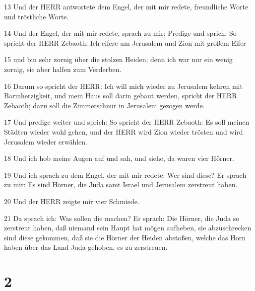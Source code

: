 \par 13 Und der HERR antwortete dem Engel, der mit mir redete, freundliche Worte und tröstliche Worte.
\par 14 Und der Engel, der mit mir redete, sprach zu mir: Predige und sprich: So spricht der HERR Zebaoth: Ich eifere um Jerusalem und Zion mit großem Eifer
\par 15 und bin sehr zornig über die stolzen Heiden; denn ich war nur ein wenig zornig, sie aber halfen zum Verderben.
\par 16 Darum so spricht der HERR: Ich will mich wieder zu Jerusalem kehren mit Barmherzigkeit, und mein Haus soll darin gebaut werden, spricht der HERR Zebaoth; dazu soll die Zimmerschnur in Jerusalem gezogen werde.
\par 17 Und predige weiter und sprich: So spricht der HERR Zebaoth: Es soll meinen Städten wieder wohl gehen, und der HERR wird Zion wieder trösten und wird Jerusalem wieder erwählen.
\par 18 Und ich hob meine Augen auf und sah, und siehe, da waren vier Hörner.
\par 19 Und ich sprach zu dem Engel, der mit mir redete: Wer sind diese? Er sprach zu mir: Es sind Hörner, die Juda samt Israel und Jerusalem zerstreut haben.
\par 20 Und der HERR zeigte mir vier Schmiede.
\par 21 Da sprach ich: Was sollen die machen? Er sprach: Die Hörner, die Juda so zerstreut haben, daß niemand sein Haupt hat mögen aufheben, sie abzuschrecken sind diese gekommen, daß sie die Hörner der Heiden abstoßen, welche das Horn haben über das Land Juda gehoben, es zu zerstreuen.

\chapter{2}

